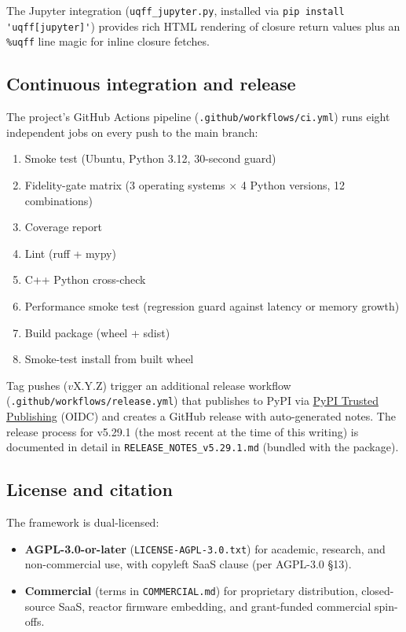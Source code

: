 The Jupyter integration (\texttt{uqff\_jupyter.py}, installed via
\verb|pip install 'uqff[jupyter]'|) provides rich HTML rendering of
closure return values plus an \verb|%uqff| line magic for inline
closure fetches.

\subsection{Continuous integration and release}
\label{sec:cicd}

The project's GitHub Actions pipeline (\texttt{.github/workflows/ci.yml})
runs eight independent jobs on every push to the main branch:

\begin{enumerate}
  \item Smoke test (Ubuntu, Python 3.12, 30-second guard)
  \item Fidelity-gate matrix (3 operating systems $\times$ 4 Python
        versions, 12 combinations)
  \item Coverage report
  \item Lint (ruff + mypy)
  \item C++ Python cross-check
  \item Performance smoke test (regression guard against
        latency or memory growth)
  \item Build package (wheel + sdist)
  \item Smoke-test install from built wheel
\end{enumerate}

Tag pushes ($v$X.Y.Z) trigger an additional release workflow
(\texttt{.github/workflows/release.yml}) that publishes to PyPI via
\href{https://docs.pypi.org/trusted-publishers/}{PyPI Trusted
Publishing} (OIDC) and creates a GitHub release with auto-generated
notes. The release process for v5.29.1 (the most recent at the time
of this writing) is documented in detail in
\texttt{RELEASE\_NOTES\_v5.29.1.md} (bundled with the package).

\subsection{License and citation}
\label{sec:license}

The framework is dual-licensed:

\begin{itemize}
  \item \textbf{AGPL-3.0-or-later} (\texttt{LICENSE-AGPL-3.0.txt}) for
        academic, research, and non-commercial use, with copyleft
        SaaS clause (per AGPL-3.0 §13).
  \item \textbf{Commercial} (terms in \texttt{COMMERCIAL.md}) for
        proprietary distribution, closed-source SaaS, reactor firmware
        embedding, and grant-funded commercial spin-offs.
\end{itemize}

